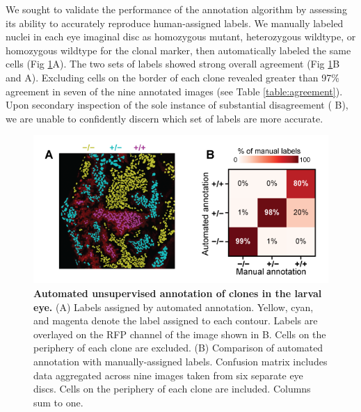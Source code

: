 \documentclass[10pt,letterpaper]{article}
\begin{document}
We sought to validate the performance of the annotation algorithm by assessing its ability to accurately reproduce human-assigned labels. We manually labeled nuclei in each eye imaginal disc as homozygous mutant, heterozygous wildtype, or homozygous wildtype for the clonal marker, then automatically labeled the same cells (Fig \ref{fig4}A). The two sets of labels showed strong overall agreement (Fig \ref{fig4}B and  A). Excluding cells on the border of each clone revealed greater than 97\% agreement in seven of the nine annotated images (see Table \ref{table:agreement}). Upon secondary inspection of the sole instance of substantial disagreement ( B), we are unable to confidently discern which set of labels are more accurate.

\begin{figure}[t]
\centering
\includegraphics[scale=1.0]{./figure_4}
\caption{\textbf{Automated unsupervised annotation of clones in the larval eye.}
(A) Labels assigned by automated annotation. Yellow, cyan, and magenta denote the label assigned to each contour. Labels are overlayed on the RFP channel of the image shown in  B. Cells on the periphery of each clone are excluded. (B) Comparison of automated annotation with manually-assigned labels. Confusion matrix includes data aggregated across nine images taken from six separate eye discs. Cells on the periphery of each clone are included. Columns sum to one.}
\label{fig4}
\end{figure}
\end{document}

